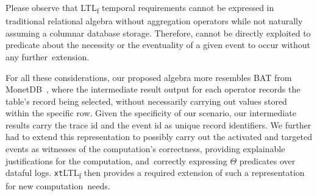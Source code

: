 \documentclass[information,article,accept,pdftex,oneauthor]{Definitions/mdpi}
\begin{document}
 Please observe that LTL\textsubscript{f} temporal requirements cannot be expressed in traditional relational algebra without aggregation operators while not naturally assuming a columnar database storage. Therefore,  cannot be directly exploited to predicate about the necessity or the eventuality of a given event to occur without any further~extension.

For all these considerations, our proposed algebra more resembles BAT from MonetDB~\cite{IdreosGNMMK12,DBLP:journals/pvldb/BonczMK09}, where the intermediate result output for each operator records the table's record being selected, without necessarily carrying out values stored within the specific row. Given the specificity of our scenario, our intermediate results carry the trace id and the event id as unique record identifiers. We further had to extend this representation to possibly carry out the activated and targeted events as witnesses of the computation's correctness, providing explainable justifications for the computation, and~correctly expressing $\Theta$ predicates over dataful logs. \texttt{xt}LTL\textsubscript{f} then provides a required extension of such a representation for new computation~needs.
\end{document}
